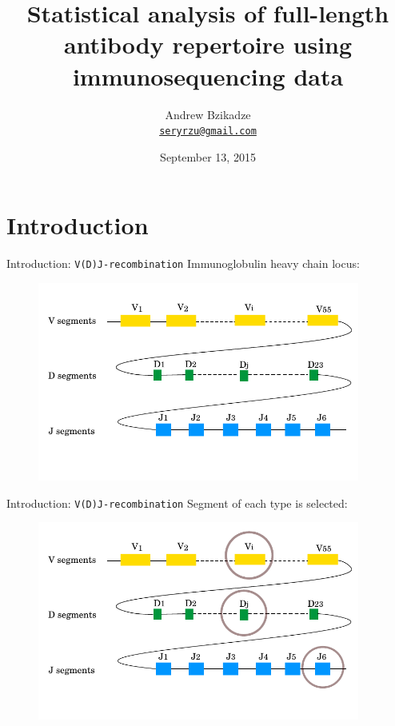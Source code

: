 \documentclass{beamer}\usepackage[]{graphicx}\usepackage[]{color}
\title[Statistical analysis of an antibody repertoire]{Statistical analysis of full-length antibody repertoire using immunosequencing data}
\author [Andrew Bzikadze]{Andrew Bzikadze\\ \texttt{\small{\href{mailto:seryrzu@gmail.com}{seryrzu@gmail.com}}}}
\date {
September 13, 2015
}
\begin{document}
\begin{frame}
  \titlepage
\end{frame}

\section{Introduction}

\begin{frame}{Introduction: \texttt{V(D)J-recombination}}
  Immunoglobulin heavy chain locus:
  \begin{figure}[h]
    \center\includegraphics[width=300pt]{Pictures/vdj1.pdf}
 \end{figure}
\end{frame}

\begin{frame}{Introduction: \texttt{V(D)J-recombination}}
  Segment of each type is selected: 
  \begin{figure}[h]
    \center\includegraphics[width=300pt]{Pictures/vdj2_select_genes.pdf}
 \end{figure}
\end{frame}
\end{document}
